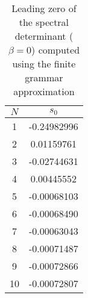 \begin{table}
	\begin{tabular}{c|c}
	 $N$ & $s_0$ \\ 
	\hline
	1 & -0.24982996 \\ 
 	2 & 0.01159761 \\ 
 	3 & -0.02744631 \\ 
 	4 & 0.00445552 \\ 
 	5 & -0.00068103 \\ 
 	6 & -0.00068490 \\ 
 	7 & -0.00063043 \\ 
 	8 & -0.00071487 \\ 
 	9 & -0.00072866 \\ 
 	10 & -0.00072807 \\ 
 	\end{tabular}
	\caption{Leading zero of the spectral determinant ($ \beta = 0 $) 
    computed using the finite grammar approximation}
	\label{t-s0}
\end{table}
